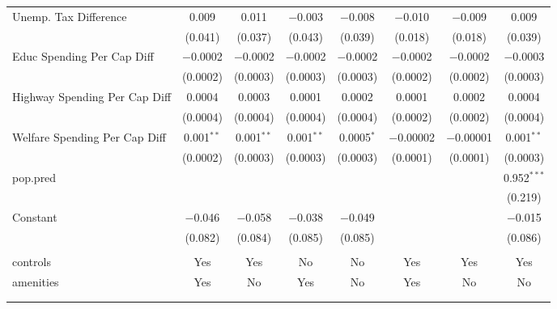 \begin{table}[!htbp]
\begin{tabular}{@{\extracolsep{5pt}}lccccccc}
  Unemp. Tax Difference & 0.009 & 0.011 & $-$0.003 & $-$0.008 & $-$0.010 & $-$0.009 & 0.009 \\ 
  & (0.041) & (0.037) & (0.043) & (0.039) & (0.018) & (0.018) & (0.039) \\ 
  Educ Spending Per Cap Diff & $-$0.0002 & $-$0.0002 & $-$0.0002 & $-$0.0002 & $-$0.0002 & $-$0.0002 & $-$0.0003 \\ 
  & (0.0002) & (0.0003) & (0.0003) & (0.0003) & (0.0002) & (0.0002) & (0.0003) \\ 
  Highway Spending Per Cap Diff & 0.0004 & 0.0003 & 0.0001 & 0.0002 & 0.0001 & 0.0002 & 0.0004 \\ 
  & (0.0004) & (0.0004) & (0.0004) & (0.0004) & (0.0002) & (0.0002) & (0.0004) \\ 
  Welfare Spending Per Cap Diff & 0.001$^{**}$ & 0.001$^{**}$ & 0.001$^{**}$ & 0.0005$^{*}$ & $-$0.00002 & $-$0.00001 & 0.001$^{**}$ \\ 
  & (0.0002) & (0.0003) & (0.0003) & (0.0003) & (0.0001) & (0.0001) & (0.0003) \\ 
  pop.pred &  &  &  &  &  &  & 0.952$^{***}$ \\ 
  &  &  &  &  &  &  & (0.219) \\ 
  Constant & $-$0.046 & $-$0.058 & $-$0.038 & $-$0.049 &  &  & $-$0.015 \\ 
  & (0.082) & (0.084) & (0.085) & (0.085) &  &  & (0.086) \\ 
 \hline \\[-1.8ex] 
controls & Yes & Yes & No & No & Yes & Yes & Yes \\ 
amenities & Yes & No & Yes & No & Yes & No & No \\ 
\hline \\[-1.8ex] 
\hline 
\hline \\[-1.8ex] 
\end{tabular} 
\end{table} 
